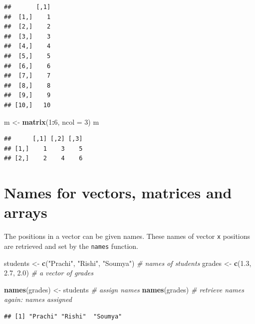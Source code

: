 \documentclass[
]{book}
\newenvironment{Shaded}{\begin{snugshade}}{\end{snugshade}}
\newcommand{\AttributeTok}[1]{\textcolor[rgb]{0.13,0.29,0.53}{#1}}
\newcommand{\CommentTok}[1]{\textcolor[rgb]{0.56,0.35,0.01}{\textit{#1}}}
\newcommand{\DecValTok}[1]{\textcolor[rgb]{0.00,0.00,0.81}{#1}}
\newcommand{\FloatTok}[1]{\textcolor[rgb]{0.00,0.00,0.81}{#1}}
\newcommand{\FunctionTok}[1]{\textcolor[rgb]{0.13,0.29,0.53}{\textbf{#1}}}
\newcommand{\NormalTok}[1]{#1}
\newcommand{\OtherTok}[1]{\textcolor[rgb]{0.56,0.35,0.01}{#1}}
\newcommand{\SpecialCharTok}[1]{\textcolor[rgb]{0.81,0.36,0.00}{\textbf{#1}}}
\newcommand{\StringTok}[1]{\textcolor[rgb]{0.31,0.60,0.02}{#1}}
\begin{document}
\begin{verbatim}
##       [,1]
##  [1,]    1
##  [2,]    2
##  [3,]    3
##  [4,]    4
##  [5,]    5
##  [6,]    6
##  [7,]    7
##  [8,]    8
##  [9,]    9
## [10,]   10
\end{verbatim}

\begin{Shaded}
\begin{Highlighting}[]
\NormalTok{m }\OtherTok{\textless{}{-}} \FunctionTok{matrix}\NormalTok{(}\DecValTok{1}\SpecialCharTok{:}\DecValTok{6}\NormalTok{, }\AttributeTok{ncol =} \DecValTok{3}\NormalTok{)}
\NormalTok{m}
\end{Highlighting}
\end{Shaded}

\begin{verbatim}
##      [,1] [,2] [,3]
## [1,]    1    3    5
## [2,]    2    4    6
\end{verbatim}

\hypertarget{names-for-vectors-matrices-and-arrays}{%
\section{Names for vectors, matrices and arrays}\label{names-for-vectors-matrices-and-arrays}}

The positions in a vector can be given names. These names of vector \texttt{x} positions are retrieved and set by the \texttt{names} function.

\begin{Shaded}
\begin{Highlighting}[]
\NormalTok{students }\OtherTok{\textless{}{-}} \FunctionTok{c}\NormalTok{(}\StringTok{"Prachi"}\NormalTok{, }\StringTok{"Rishi"}\NormalTok{, }\StringTok{"Soumya"}\NormalTok{)  }\CommentTok{\# names of students}
\NormalTok{grades }\OtherTok{\textless{}{-}} \FunctionTok{c}\NormalTok{(}\FloatTok{1.3}\NormalTok{, }\FloatTok{2.7}\NormalTok{, }\FloatTok{2.0}\NormalTok{)              }\CommentTok{\# a vector of grades}

\FunctionTok{names}\NormalTok{(grades) }\OtherTok{\textless{}{-}}\NormalTok{ students  }\CommentTok{\# assign names}
\FunctionTok{names}\NormalTok{(grades)              }\CommentTok{\# retrieve names again: names assigned}
\end{Highlighting}
\end{Shaded}

\begin{verbatim}
## [1] "Prachi" "Rishi"  "Soumya"
\end{verbatim}
\end{document}
